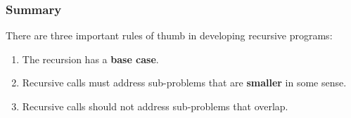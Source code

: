 \documentclass[aspectratio=169, 14pt]{beamer}
\begin{document}
\begin{frame}
\frametitle{Summary}

There are three important rules of thumb in developing recursive programs:

\begin{enumerate}
    \item The recursion has a \textbf{base case}.
    \item Recursive calls must address sub-problems that are \textbf{smaller} in some sense.
    \item Recursive calls should not address sub-problems that overlap.
\end{enumerate}
\end{frame}
\end{document}

